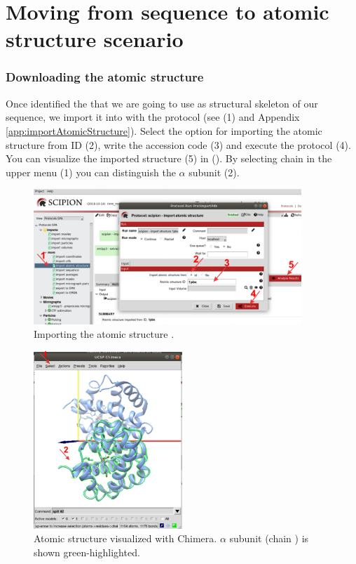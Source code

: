 \section{Moving from sequence to atomic structure scenario}

\subsubsection*{Downloading the atomic structure}
  
  Once identified the  that we are going to use as structural skeleton of our sequence, we import it into \scipion with the protocol  (see  (1) and Appendix \ref{app:importAtomicStructure}). Select the option for importing the atomic structure from ID (2), write the  accession code (3) and execute the protocol (4). You can visualize the imported structure (5) in \chimera (). By selecting chain  in the \chimera upper menu (1) you can distinguish the  $\alpha$ subunit (2).
  
  \begin{figure}[H]
  \centering 
  \captionsetup{width=.7\linewidth} 
  \includegraphics[width=0.90\textwidth]{Images/Fig10}
  \caption{Importing the atomic structure .}
  \label{fig:import_atomic_structure}
  \end{figure}
  
  \begin{figure}[H]
  \centering 
  \captionsetup{width=.7\linewidth} 
  \includegraphics[width=0.50\textwidth]{Images/Fig11}
  \caption{Atomic structure  visualized with Chimera.  $\alpha$ subunit (chain ) is shown green-highlighted.}
  \label{fig:chimera_visualization_structure}
  \end{figure}
  
